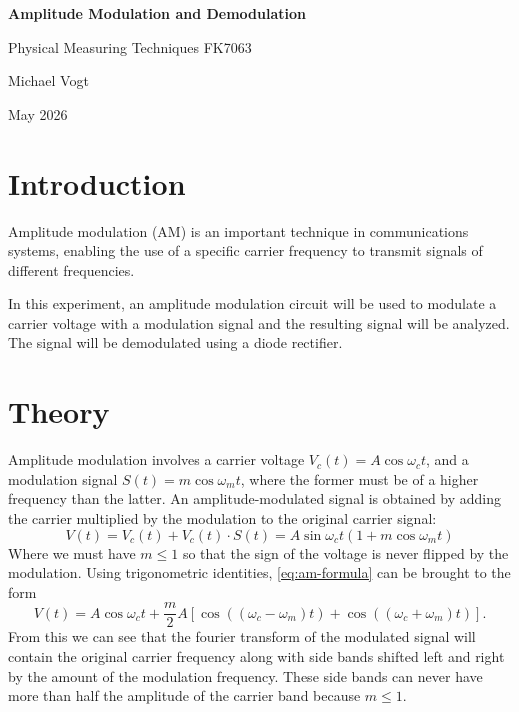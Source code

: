 \documentclass[a4paper]{scrartcl}
\begin{document}
\begin{center}
\vspace*{1cm}

\LARGE
  \textbf{Amplitude Modulation and Demodulation}

\vspace{.2cm}

\normalsize
  Physical Measuring Techniques FK7063

\vspace{.5cm}
{Michael Vogt}

May 2026
\end{center}

\vspace{1cm}



\section*{Introduction}
Amplitude modulation (AM) is an important technique in communications systems, enabling
the use of a specific carrier frequency to transmit signals of different frequencies.

In this experiment, an amplitude modulation circuit will be used to modulate
a carrier voltage with a modulation signal and the resulting signal will be analyzed.
The signal will be demodulated using a diode rectifier.




\section{Theory}
Amplitude modulation involves a carrier voltage $V_c(t) = A\cos{\omega_c t}$, 
and a modulation signal $S(t) = m\cos{\omega_m t}$,
where the former must be of a higher frequency than the latter.
An amplitude-modulated signal is obtained by adding the carrier multiplied by the modulation
to the original carrier signal:
\begin{equation}
  V(t) = V_c(t)+ V_c(t)\cdot S(t)= A\sin{\omega_c t} (1+m\cos{\omega_m t}) \label{eq:am-formula}
\end{equation}
Where we must have $m\leq 1$ so that the sign of the voltage is never flipped by the modulation.
Using trigonometric identities, \eqref{eq:am-formula} can be brought to the form \cite{manual}
\begin{equation}
  V(t) = A \cos{\omega_c t} + \frac{m}{2}A
    \left[\cos((\omega_c-\omega_m)t) + \cos((\omega_c+\omega_m)t)\right]. \label{eq:am-simplified}
\end{equation}
From this we can see that the fourier transform of the modulated signal will
contain the original carrier frequency along with side bands shifted left and right
by the amount of the modulation frequency. These side bands can never have more than
half the amplitude of the carrier band because $m\leq 1$.
\end{document}
